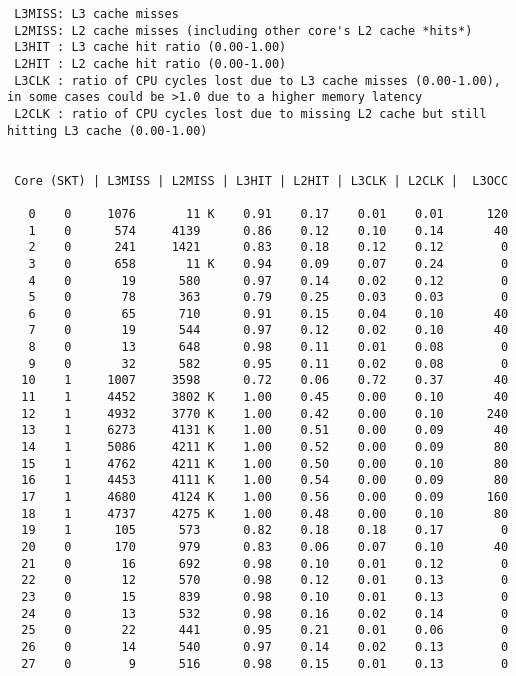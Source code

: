 \begin{lstlisting}
 L3MISS: L3 cache misses 
 L2MISS: L2 cache misses (including other core's L2 cache *hits*) 
 L3HIT : L3 cache hit ratio (0.00-1.00)
 L2HIT : L2 cache hit ratio (0.00-1.00)
 L3CLK : ratio of CPU cycles lost due to L3 cache misses (0.00-1.00), in some cases could be >1.0 due to a higher memory latency
 L2CLK : ratio of CPU cycles lost due to missing L2 cache but still hitting L3 cache (0.00-1.00)


 Core (SKT) | L3MISS | L2MISS | L3HIT | L2HIT | L3CLK | L2CLK |  L3OCC

   0    0     1076       11 K    0.91    0.17    0.01    0.01      120
   1    0      574     4139      0.86    0.12    0.10    0.14       40
   2    0      241     1421      0.83    0.18    0.12    0.12        0
   3    0      658       11 K    0.94    0.09    0.07    0.24        0
   4    0       19      580      0.97    0.14    0.02    0.12        0
   5    0       78      363      0.79    0.25    0.03    0.03        0
   6    0       65      710      0.91    0.15    0.04    0.10       40
   7    0       19      544      0.97    0.12    0.02    0.10       40
   8    0       13      648      0.98    0.11    0.01    0.08        0
   9    0       32      582      0.95    0.11    0.02    0.08        0
  10    1     1007     3598      0.72    0.06    0.72    0.37       40
  11    1     4452     3802 K    1.00    0.45    0.00    0.10       40
  12    1     4932     3770 K    1.00    0.42    0.00    0.10      240
  13    1     6273     4131 K    1.00    0.51    0.00    0.09       40
  14    1     5086     4211 K    1.00    0.52    0.00    0.09       80
  15    1     4762     4211 K    1.00    0.50    0.00    0.10       80
  16    1     4453     4111 K    1.00    0.54    0.00    0.09       80
  17    1     4680     4124 K    1.00    0.56    0.00    0.09      160
  18    1     4737     4275 K    1.00    0.48    0.00    0.10       80
  19    1      105      573      0.82    0.18    0.18    0.17        0
  20    0      170      979      0.83    0.06    0.07    0.10       40
  21    0       16      692      0.98    0.10    0.01    0.12        0
  22    0       12      570      0.98    0.12    0.01    0.13        0
  23    0       15      839      0.98    0.10    0.01    0.13        0
  24    0       13      532      0.98    0.16    0.02    0.14        0
  25    0       22      441      0.95    0.21    0.01    0.06        0
  26    0       14      540      0.97    0.14    0.02    0.13        0
  27    0        9      516      0.98    0.15    0.01    0.13        0

\end{lstlisting}
